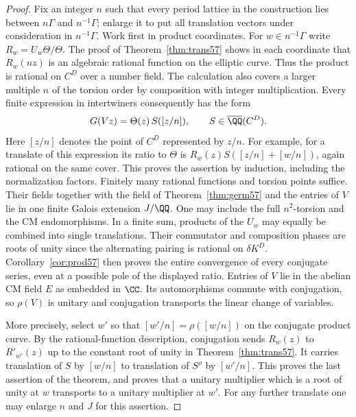 \documentclass[a4paper,11pt]{article}
\theoremstyle{definition}
\theoremstyle{remark}
\numberwithin{equation}{section}
\begin{document}
\begin{proof}
Fix an integer \(n\) such that every period lattice in the
construction lies between \(n\Gamma\) and \(n^{-1}\Gamma\);
enlarge it to put all translation vectors under consideration
in \(n^{-1}\Gamma\). Work first in product coordinates.
For \(w\in n^{-1}\Gamma\) write \(R_w=U_w\Theta/\Theta\).
The proof of Theorem~\ref{thm:trans57} shows in each coordinate
that \(R_w(nz)\) is an algebraic rational function on the
elliptic curve. Thus the product is rational on \(C^D\) over a
number field. The calculation also covers a larger multiple \(n\)
of the torsion order by composition with integer multiplication.
Every finite expression in intertwiners consequently has the form
\[
                 G(Vz)=\Theta(z)\,S([z/n]),\qquad
                 S\in\overline{\QQ}(C^D).
\]
Here \([z/n]\) denotes the point of \(C^D\) represented by \(z/n\).
For example, for a translate of this expression its ratio to
\(\Theta\) is \(R_w(z) S([z/n]+[w/n])\), again rational on the
same cover. This proves the assertion by induction, including
the normalization factors. Finitely many rational functions
and torsion points suffice. Their fields together with the field
of Theorem~\ref{thm:germ57} and the entries of \(V\) lie in one
finite Galois extension \(J/\QQ\). One may include the full
\(n^2\)-torsion and the CM endomorphisms. In a finite sum,
products of the \(U_w\) may equally be combined into single
translations. Their commutator and composition phases are roots
of unity since the alternating pairing is rational on
\(\delta K^D\). Corollary~\ref{cor:prod57} then proves the entire
convergence of every conjugate series, even at a possible pole of
the displayed ratio. Entries of \(V\) lie in the abelian CM
field \(E\) as embedded in \(\CC\). Its automorphisms commute
with conjugation, so \(\rho(V)\) is unitary and conjugation
transports the linear change of variables.

More precisely, select \(w'\) so that \([w'/n]=\rho([w/n])\) on
the conjugate product curve. By the rational-function description,
conjugation sends \(R_w(z)\) to \(R'_{w'}(z)\) up to the constant
root of unity in Theorem~\ref{thm:trans57}. It carries translation
of \(S\) by \([w/n]\) to translation of \(S^\rho\) by \([w'/n]\).
This proves the last assertion of the theorem, and proves that a
unitary multiplier which is a root of unity at \(w\) transports
to a unitary multiplier at \(w'\). For any further translate one
may enlarge \(n\) and \(J\) for this assertion.


\end{proof}
\end{document}
